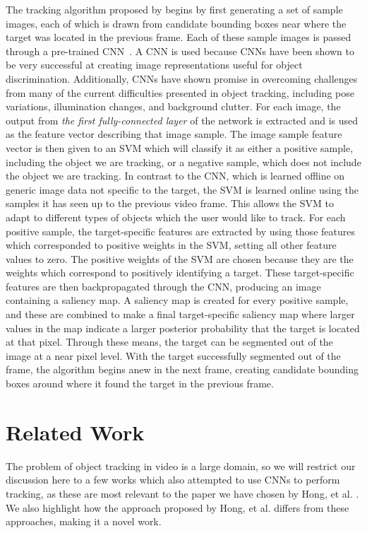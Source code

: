 \documentclass{sig-alternate-05-2015}
\begin{document}
The tracking algorithm proposed by \cite{hong2015online} begins by first generating a set of sample images, each of which is drawn from candidate bounding boxes near where the target was located in the previous frame.
Each of these sample images is passed through a pre-trained CNN~\cite{jia2014caffe}.
A CNN is used because CNNs have been shown to be very successful at creating image representations useful for object discrimination.
Additionally, CNNs have shown promise in overcoming challenges from many of the current difficulties presented in object tracking, including pose variations, illumination changes, and background clutter.
For each image, the output from \textit{the first fully-connected layer} of the network is extracted and is used as the feature vector describing that image sample.
The image sample feature vector is then given to an SVM which will classify it as either a positive sample, including the object we are tracking, or a negative sample, which does not include the object we are tracking.
In contrast to the CNN, which is learned offline on generic image data not specific to the target, the SVM is learned online using the samples it has seen up to the previous video frame.
This allows the SVM to adapt to different types of objects which the user would like to track.
For each positive sample, the target-specific features are extracted by using those features which corresponded to positive weights in the SVM, setting all other feature values to zero.
The positive weights of the SVM are chosen because they are the weights which correspond to positively identifying a target.
These target-specific features are then backpropagated through the CNN, producing an image containing a saliency map.
A saliency map is created for every positive sample, and these are combined to make a final target-specific saliency map where larger values in the map indicate a larger posterior probability that the target is located at that pixel.
Through these means, the target can be segmented out of the image at a near pixel level.
With the target successfully segmented out of the frame, the algorithm begins anew in the next frame, creating candidate bounding boxes around where it found the target in the previous frame.

\section{Related Work}
The problem of object tracking in video is a large domain, so we will restrict our discussion here to a few works which also attempted to use CNNs to perform tracking, as these are most relevant to the paper we have chosen by Hong, et al. \cite{hong2015online}.
We also highlight how the approach proposed by Hong, et al. differs from these approaches, making it a novel work.
\end{document}
